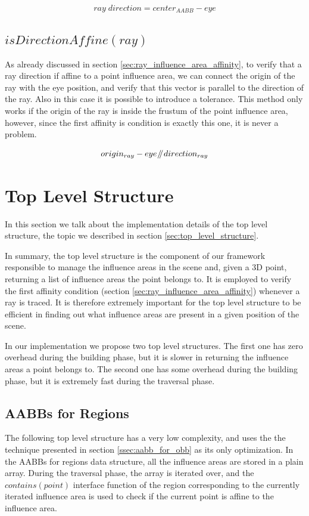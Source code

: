 \documentclass{PoliMi_MasterThesis}
\begin{document}
$$ray\; direction = center_{AABB} - eye$$

\subsection*{$isDirectionAffine(ray)$}
As already discussed in section \ref{sec:ray_influence_area_affinity}, to verify that a ray direction if affine to a point influence area, we can connect the origin of the ray with the eye position, and verify that this vector is parallel to the direction of the ray. Also in this case it is possible to introduce a tolerance. This method only works if the origin of the ray is inside the frustum of the point influence area, however, since the first affinity is condition is exactly this one, it is never a problem.

$$origin_{ray} - eye \mathbin{\!/\mkern-5mu/\!} direction_{ray}$$

\section{Top Level Structure} \label{sec:top_level}
In this section we talk about the implementation details of the top level structure, the topic we described in section \ref{sec:top_level_structure}.

In summary, the top level structure is the component of our framework responsible to manage the influence areas in the scene and, given a 3D point, returning a list of influence areas the point belongs to. It is employed to verify the first affinity condition (section \ref{sec:ray_influence_area_affinity}) whenever a ray is traced. It is therefore extremely important for the top level structure to be efficient in finding out what influence areas are present in a given position of the scene.

In our implementation we propose two top level structures. The first one has zero overhead during the building phase, but it is slower in returning the influence areas a point belongs to. The second one has some overhead during the building phase, but it is extremely fast during the traversal phase.

\subsection{AABBs for Regions} \label{ssec:top_level_aabbs}
The following top level structure has a very low complexity, and uses the the technique presented in section \ref{ssec:aabb_for_obb} as its only optimization.
In the AABBs for regions data structure, all the influence areas are stored in a plain array. During the traversal phase, the array is iterated over, and the $contains(point)$ interface function of the region corresponding to the currently iterated influence area is used to check if the current point is affine to the influence area.
\end{document}
